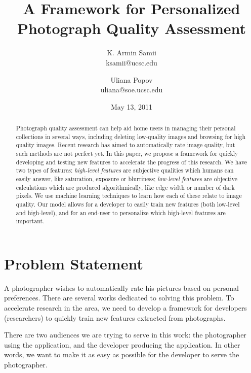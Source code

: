 \documentclass[10pt,twocolumn]{article}
\title{A Framework for Personalized Photograph Quality Assessment}
\author{
K. Armin Samii \\
ksamii@ucsc.edu
\and
Uliana Popov \\
uliana@soe.ucsc.edu}
\date{May 13, 2011}
\begin{document}
\maketitle
\begin{abstract}
Photograph quality assessment can help aid home users in managing their personal collections in several ways, including deleting low-quality images and browsing for high quality images. Recent research has aimed to automatically rate image quality, but such methods are not perfect yet. %
In this paper, we propose a framework for quickly developing and testing new features to accelerate the progress of this research. We have two types of features: \textit{high-level features} are subjective qualities which humans can easily answer, like saturation, exposure or blurriness; \textit{low-level features} are objective calculations which are produced algorithmically, like edge width or number of dark pixels. We use machine learning techniques to learn how each of these relate to image quality. Our model allows for a developer to easily train new features (both low-level and high-level), and for an end-user to personalize which high-level features are important.



\end{abstract}

\section{Problem Statement}
A photographer wishes to automatically rate his pictures based on personal preferences. There are several works dedicated to solving this problem. To accelerate research in the area, we need to develop a framework for developers (researchers) to quickly train new features extracted from photographs.

There are two audiences we are trying to serve in this work: the photographer using the application, and the developer producing the application. In other words, we want to make it as easy as possible for the developer to serve the photographer.
\end{document}
